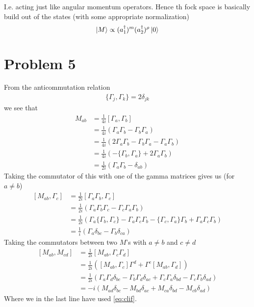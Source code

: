 \documentclass[a4paper,12pt]{article}
\begin{document}
I.e. acting just like angular momentum operators. Hence th fock space is basically build out of the states (with some appropriate normalization)
\begin{equation}
	\begin{aligned}
		\ket{M}\propto(a_1^\dagger)^{m} (a_2^\dagger) ^{\rho}\ket{0}
	\end{aligned}
\end{equation}
\section*{Problem 5}
From the anticommutation relation
\begin{equation}
	\begin{aligned}
		\{\Gamma_j,\Gamma_k\}=2\delta_{jk}
	\end{aligned}
\end{equation}
we see that
\begin{equation} \label{eq:clif}
	\begin{aligned}
		M_{ab}&=\frac{1}{4i}\left[\Gamma_a,\Gamma_b\right]
		\\
		&=\frac{1}{4i}\left(\Gamma_a\Gamma_b-\Gamma_b\Gamma_a\right)\\
		&=\frac{1}{4i}\left(2\Gamma_a\Gamma_b-\Gamma_b\Gamma_a-\Gamma_a\Gamma_b\right)\\
		&=\frac{1}{4i}\left(-\{\Gamma_b,\Gamma_a\}+2\Gamma_a\Gamma_b\right)\\
			&=\frac{1}{2i}\left(\Gamma_a\Gamma_b-\delta_{ab}\right)
	\end{aligned}
\end{equation}
Taking the commutator of this with one of the gamma matrices gives us (for $a\neq b$)
\begin{equation}
	\begin{aligned}
		\left[M_{ab},\Gamma_c\right]&=\frac{1}{2i}\left[\Gamma_a\Gamma_b,\Gamma_c\right]\\
		&=\frac{1}{2i}\left(\Gamma_a\Gamma_b\Gamma_c-\Gamma_c\Gamma_a\Gamma_b\right)\\
		&=\frac{1}{2i}\left(\Gamma_a\{\Gamma_b,\Gamma_c\}-\Gamma_a\Gamma_c\Gamma_b-\{\Gamma_c,\Gamma_a\}\Gamma_b+\Gamma_a\Gamma_c\Gamma_b\right)\\
		&=\frac{1}{i}\left(\Gamma_a \delta_{bc}-\Gamma_b \delta_{ca}\right)
	\end{aligned}
\end{equation}
Taking the commutators between two $M$'s with $a\neq b$ and $c\neq d$
\begin{equation}
	\begin{aligned}
		\left[M_{ab},M_{cd}\right]&=\frac{1}{2i}\left[M_{ab},\Gamma_{c}\Gamma_{d}\right]\\
		&=\frac{1}{2i}\left(\left[M_{ab},\Gamma_{c}\right]\Gamma^d+\Gamma^c\left[M_{ab},\Gamma_{d}\right]\right)\\
		&=\frac{1}{2i}\left(
		\Gamma_a\Gamma_d\delta_{bc}-\Gamma_b\Gamma_d\delta_{ac}+\Gamma_c\Gamma_a\delta_{bd}-\Gamma_c\Gamma_b\delta_{ad}
		\right)\\
		&=-i\left(M_{ad}\delta_{bc}-M_{bd}\delta_{ac}+M_{ca}\delta_{bd}-M_{cb}\delta_{ad}\right)
	\end{aligned}
\end{equation}
Where we in the last line have used \eqref{eq:clif}.
\end{document}
